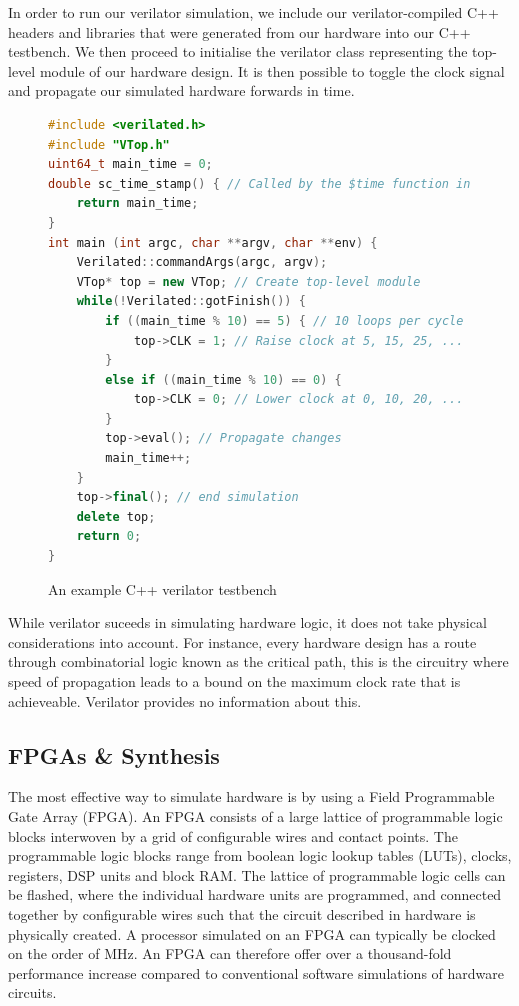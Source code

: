 \documentclass[a4paper,8pt]{report}
\begin{document}
In order to run our verilator simulation, we include our verilator-compiled C++
headers and libraries that were generated from our hardware into our C++
testbench. We then proceed to initialise the verilator class representing the
top-level module of our hardware design. It is then possible to toggle the clock
signal and propagate our simulated hardware forwards in time.
\begin{figure}[h]
\begin{lstlisting}[language=C++,style=customcpp,xleftmargin=.05\textwidth]
#include <verilated.h>
#include "VTop.h"
uint64_t main_time = 0;
double sc_time_stamp() { // Called by the $time function in Verilog
    return main_time;
}
int main (int argc, char **argv, char **env) {
    Verilated::commandArgs(argc, argv);
    VTop* top = new VTop; // Create top-level module
    while(!Verilated::gotFinish()) {
        if ((main_time % 10) == 5) { // 10 loops per cycle
            top->CLK = 1; // Raise clock at 5, 15, 25, ...
        }
        else if ((main_time % 10) == 0) {
            top->CLK = 0; // Lower clock at 0, 10, 20, ...
        }
        top->eval(); // Propagate changes
        main_time++;
    }
    top->final(); // end simulation
    delete top;
    return 0;
}

\end{lstlisting}
\caption{An example C++ verilator testbench}
\end{figure}

While verilator suceeds in simulating hardware logic, it does not take physical
considerations into account. For instance, every hardware design has a route through
combinatorial logic known as the critical path, this is the circuitry where
speed of propagation leads to a bound on the maximum clock rate that is
achieveable. Verilator provides no information about this.


\subsection{FPGAs \& Synthesis}
The most effective way to simulate hardware is by using a Field Programmable
Gate Array (FPGA). An FPGA consists of a large lattice of programmable logic
blocks interwoven by a grid of configurable wires and contact points. The
programmable logic blocks range from boolean logic lookup tables (LUTs), clocks,
registers, DSP units and block RAM. The lattice of programmable logic cells can
be flashed, where the individual hardware units are programmed, and connected
together by configurable wires such that the circuit described in hardware is
physically created. A processor simulated on an FPGA can typically be clocked on
the order of MHz. An FPGA can therefore offer over a thousand-fold performance
increase compared to conventional software simulations of hardware circuits.
\end{document}
